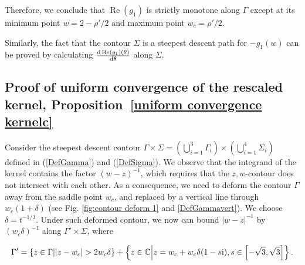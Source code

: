 \documentclass[cmp]{svjour}
\numberwithin{theorem}{section}
\numberwithin{equation}{section}
\def\dd{{\rm d}}
\def\ii{{\rm i}}
\DeclareMathOperator{\R}{Re}
\begin{document}
Therefore, we conclude that $\R(g_1)$ is strictly monotone along $\Gamma$ except at its minimum point $w=2-\rho'/2$ and maximum point $w_c=\rho'/2$.
	
Similarly, the fact that the contour $\Sigma$ is a steepest descent path for $-g_1(w)$ can be proved by calculating $\tfrac{\dd \R(g_1)(\theta)}{\dd \theta}$ along $\Sigma$.



\subsection{Proof of uniform convergence of the rescaled kernel, Proposition~\ref{uniform convergence kernelc}}
\label{Unif_conv_Kc}






Consider the steepest descent contour $\Gamma\times \Sigma =(\bigcup_{i=1}^3 \Gamma_i) \times (\bigcup_{i=1}^4 \Sigma_i)$ defined in (\ref{DefGamma}) and (\ref{DefSigma}). We observe that the integrand of the kernel contains the factor $(w-z)^{-1}$, which requires that the $z,w$-contour does not intersect with each other. As a consequence, we need to deform the contour $\Gamma$ away from the saddle point $w_c$, and replaced by a vertical line through $w_c(1+\delta)$ (see Fig. \ref{fig:contour deform 1} and \eqref{DefGammavert}). We choose $\delta=t^{-1/3}$. Under such deformed contour, we now can bound $|w-z|^{-1}$ by $(w_c \delta)^{-1}$ along $\Gamma' \times \Sigma$, where

\begin{equation}
	\Gamma' = \left\{ z \in \Gamma \middle| | z - w_c | > 2 w_c \delta  \right\} + \left\{ z \in \mathbb{C} \middle| z = w_c + w_c \delta (1 - s \ii) , s \in \left[  -\sqrt{3} , \sqrt{3} \right]  \right\} . \label{DefGammavert}
\end{equation}
\end{document}
